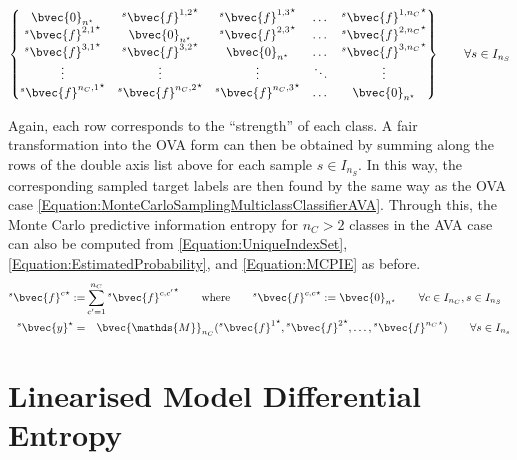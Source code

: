 				\begin{equation}
					\begin{Bmatrix*}
						\bvec{0}_{n^{\star}} & {^{s}}{\bvec{f}^{1, 2}}^{\star} & {^{s}}{\bvec{f}^{1, 3}}^{\star} & \dots & {^{s}}{\bvec{f}^{1, n_{C}}}^{\star} \\
						{^{s}}{\bvec{f}^{2, 1}}^{\star} & \bvec{0}_{n^{\star}} & {^{s}}{\bvec{f}^{2, 3}}^{\star} & \dots & {^{s}}{\bvec{f}^{2, n_{C}}}^{\star} \\
						{^{s}}{\bvec{f}^{3, 1}}^{\star} & {^{s}}{\bvec{f}^{3, 2}}^{\star} & \bvec{0}_{n^{\star}} & \dots & {^{s}}{\bvec{f}^{3, n_{C}}}^{\star} \\
						\vdots & \vdots & \vdots & \ddots & \vdots \\
						{^{s}}{\bvec{f}^{n_{C}, 1}}^{\star} & {^{s}}{\bvec{f}^{n_{C}, 2}}^{\star} & {^{s}}{\bvec{f}^{n_{C}, 3}}^{\star} & \dots & \bvec{0}_{n^{\star}} 
					\end{Bmatrix*} \qquad \forall s \in I_{n_{S}}
				\label{Equation:SampleLatentListAVA}
				\end{equation}
				
				Again, each row corresponds to the ``strength'' of each class. A fair transformation into the OVA form can then be obtained by summing along the rows of the double axis list above for each sample $s \in I_{n_{S}}$. In this way, the corresponding sampled target labels are then found by the same way as the OVA case \eqref{Equation:MonteCarloSamplingMulticlassClassifierAVA}. Through this, the Monte Carlo predictive information entropy for $n_{C} > 2$ classes in the AVA case can also be computed from \eqref{Equation:UniqueIndexSet}, \eqref{Equation:EstimatedProbability}, and \eqref{Equation:MCPIE} as before. \begin{equation}
					\begin{aligned}
						{^{s}}{\bvec{f}^{c}}^{\star} :=& \sum_{c' = 1}^{n_{C}} {^{s}}{\bvec{f}^{c, c'}}^{\star} \qquad \text{where} \qquad {^{s}}{\bvec{f}^{c, c}}^{\star} := \bvec{0}_{n^{\star}} \qquad \forall c \in I_{n_{C}}, s \in I_{n_{S}} \\
						{^{s}}\bvec{y}^{\star} =& \quad \bvec{\mathds{M}}_{n_{C}}({^{s}}{\bvec{f}^{1}}^{\star}, {^{s}}{\bvec{f}^{2}}^{\star}, \dots, {^{s}}{\bvec{f}^{n_{C}}}^{\star}) \qquad \forall s \in I_{n_{s}}
					\end{aligned}
				\label{Equation:MonteCarloSamplingMulticlassClassifierAVA}
				\end{equation}
					
	\section{Linearised Model Differential Entropy}
	\label{InformativeSeafloorExploration:LMDE}
	
